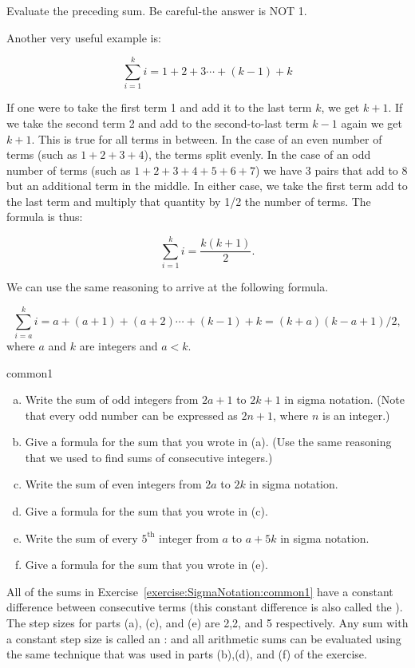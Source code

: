 \begin{exercise}{}
Evaluate the preceding sum. Be careful-the answer is NOT 1. 
\end{exercise}

Another very useful example is:

\[\sum_{i=1}^{k}i=1+2+3\cdots+(k-1) + k\]

If one were to take the first term 1 and add it to the last term $k$, we get $k+1$.  If we take the second term 2 and add to the second-to-last term $k-1$ again we get $k+1$.  This is true for all terms in between.  In the case of an even number of terms (such as $1+2+3+4$),  the terms split evenly.  In the case of an odd number of terms (such as $1+2+3+4+5+6+7$) we have 3 pairs that add to 8 but an additional term in the middle.  In either case, we take the first term add to the last term and multiply that quantity by 1/2 the number of terms.  The formula is thus:

\[\sum_{i=1}^{k}i= \frac{k(k+1)}{2}.\] 

We can use the same reasoning to arrive at the following formula.

\[\sum_{i=a}^{k}i=a+(a+1)+(a+2)\cdots+(k-1) + k = (k+a)(k-a+1)/2,\] 
where $a$ and $k$ are integers and $a<k$.


\begin{exercise}{common1}
\begin{enumerate}[(a)]
\item 
Write the sum of odd integers from $2a+1$ to $2k+1$ in sigma notation. (Note that every odd number can be expressed as $2n+1$, where $n$ is an integer.)
\item
Give a formula for the sum that you wrote in (a).  (Use the same reasoning that we used to find sums of consecutive integers.)
\item 
Write the sum of even integers from $2a$ to $2k$ in sigma notation.
\item
Give a formula for the sum that you wrote in (c). 
\item 
Write the sum of every $5^{\text{th}}$ integer from $a$ to $a + 5k$ in sigma notation.
\item
Give a formula for the sum that you wrote in (e). 
\end {enumerate}
\end {exercise}

All of the sums in Exercise~\ref{exercise:SigmaNotation:common1} have a constant difference between consecutive terms (this constant difference is also called the ). The step sizes for parts (a), (c), and (e) are 2,2, and 5 respectively.  Any sum with a constant step size is called an : and all arithmetic sums can be evaluated using the same technique that was used  in parts (b),(d), and (f) of the exercise.  

